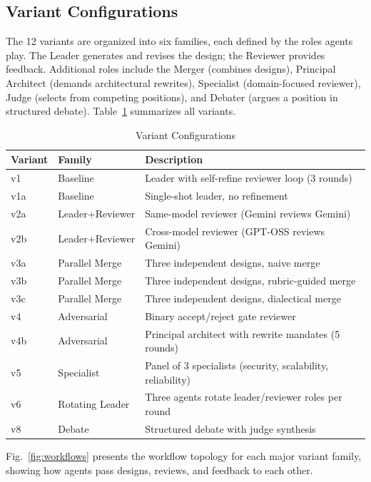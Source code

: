 \documentclass[conference]{IEEEtran}
\begin{document}
\subsection{Variant Configurations}
The 12 variants are organized into six families, each defined by the roles agents play. The Leader generates and revises the design; the Reviewer provides feedback. Additional roles include the Merger (combines designs), Principal Architect (demands architectural rewrites), Specialist (domain-focused reviewer), Judge (selects from competing positions), and Debater (argues a position in structured debate). Table~\ref{tab:variants} summarizes all variants.

\begin{table}[t]
\centering
\caption{Variant Configurations}
\label{tab:variants}
\begin{tabular}{llp{}}
\toprule
Variant & Family & Description \\
\midrule
v1 & Baseline & Leader with self-refine reviewer loop (3 rounds) \\
v1a & Baseline & Single-shot leader, no refinement \\
v2a & Leader+Reviewer & Same-model reviewer (Gemini reviews Gemini) \\
v2b & Leader+Reviewer & Cross-model reviewer (GPT-OSS reviews Gemini) \\
v3a & Parallel Merge & Three independent designs, naive merge \\
v3b & Parallel Merge & Three independent designs, rubric-guided merge \\
v3c & Parallel Merge & Three independent designs, dialectical merge \\
v4 & Adversarial & Binary accept/reject gate reviewer \\
v4b & Adversarial & Principal architect with rewrite mandates (5 rounds) \\
v5 & Specialist & Panel of 3 specialists (security, scalability, reliability) \\
v6 & Rotating Leader & Three agents rotate leader/reviewer roles per round \\
v8 & Debate & Structured debate with judge synthesis \\
\bottomrule
\end{tabular}
\end{table}

Fig.~\ref{fig:workflows} presents the workflow topology for each major variant family, showing how agents pass designs, reviews, and feedback to each other.
\end{document}
